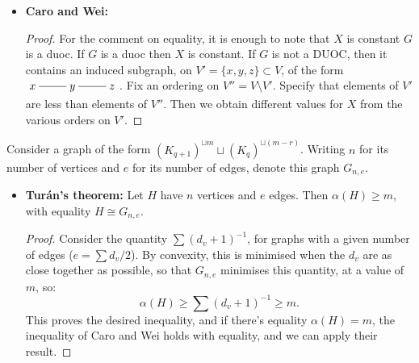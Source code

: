 \documentclass[11pt]{article}
\newenvironment{INT}[1][]{\begin{itemize}\small\item\textbf{#1}}{\end{itemize}}
\begin{document}
\begin{chapter6}
\begin{INT}[Caro and Wei:]
\begin{proof}
\INDENT For the comment on equality, it is enough to note that $X$ is constant \Iff $G$ is a {\sc duoc}. If $G$ is a {\sc duoc} then $X$ is constant. If $G$ is not a \textsc{DUOC}, then it contains an induced subgraph, on $V'=\{x,y,z\}\subset V$, of the form $\xymatrix{x\ar@{-}[r]&y\ar@{-}[r]&z}$. Fix an ordering on $V''=V\setminus V'$. Specify that elements of $V'$ are less than elements of $V''$. Then we obtain different values for $X$ from the various orders on $V'$.
\end{proof}
\end{INT}
Consider a graph of the form $(K_{q+1})^{\sqcup m}\sqcup(K_{q})^{\sqcup (m-r)}$. Writing $n$ for its number of vertices and $e$ for its number of edges, denote this graph $G_{n,e}$.
\begin{INT}[Tur\'an's theorem:]
Let $H$ have $n$ vertices and $e$ edges. Then $\alpha(H)\geq m$, with equality \Iff $H\cong G_{n,e}$.
\begin{proof}
Consider the quantity $\sum(d_v+1)^{-1}$, for graphs with a given number of edges ($e=\sum d_v/2$). By convexity, this is minimised when the $d_v$ are as close together as possible, so that $G_{n,e}$ minimises this quantity, at a value of $m$, so:
\[\alpha(H)\geq\sum(d_v+1)^{-1}\geq m.\]
This proves the desired inequality, and if there's equality $\alpha(H)=m$, the inequality of Caro and Wei holds with equality, and we can apply their result.
\end{proof}
\end{INT}

\end{chapter6}
\end{document}
